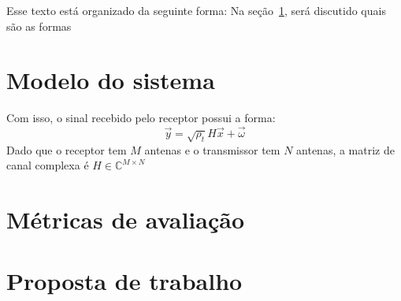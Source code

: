 \documentclass{article}
\begin{document}
	Esse texto está organizado da seguinte forma:
	Na seção~\ref{sec:modelo_sistema}, será discutido quais são as formas 

	\section{Modelo do sistema}
	\label{sec:modelo_sistema}

	Com isso, o sinal recebido pelo receptor possui a forma:
	\begin{equation}
		\vec{y}=\sqrt{\rho_t}H\vec{x}+\vec{\omega}
		\label{eq:recepcao_sinal_mimo}
	\end{equation}
	Dado que o receptor tem $M$ antenas e o transmissor tem $N$ antenas, a matriz de canal complexa é $H\in\mathbb{C}^{M\times N}$
	

	\section{Métricas de avaliação}
	\label{sec:metricas_avaliacao}
		

	\section{Proposta de trabalho}
	\label{sec:proposta_trabalho}


	
	
\end{document}
